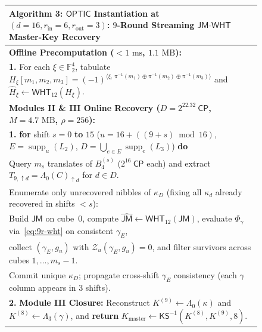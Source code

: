 \documentclass[11pt,a4paper]{article}
\theoremstyle{definition}
\theoremstyle{remark}
\newcommand{\Ftwo}{\mathbb{F}_2}
\newcommand{\OPTIC}{\mathsf{OPTIC}}
\newcommand{\supp}{\operatorname{supp}}
\newcommand{\CP}{\mathsf{CP}}
\begin{document}
\begin{figure}[t]
\centering
\small
\begin{tabular}{@{}p{}@{}}
\toprule
\textbf{Algorithm 3:} $\OPTIC$ Instantiation at $(d{=}16, r_{\text{in}}{=}6, r_{\text{out}}{=}3)$: $9$-Round Streaming $\mathsf{JM\text{-}WHT}$ Master-Key Recovery \\
\midrule
\textbf{Offline Precomputation ($< 1\text{ ms}$, $1.1\text{ MB}$):} \\
\hspace*{1.2em} \textbf{1.} For each $\xi \in \Ftwo^4$, tabulate $H_\xi[m_1, m_2, m_3] = (-1)^{\langle \xi,\, \pi^{-1}(m_1)\oplus\pi^{-1}(m_2)\oplus\pi^{-1}(m_3)\rangle}$ and $\widehat{H}_\xi \leftarrow \mathsf{WHT}_{12}(H_\xi)$. \\[3pt]
\midrule
\textbf{Modules II \& III Online Recovery ($D = 2^{22.32}~\CP$, $M = 4.7\text{ MB}$, $\rho = 256$):} \\
\hspace*{1.2em} \textbf{1.} \textbf{for} shift $s = 0$ \textbf{to} $15$ ($u = 16 + ((9 + s)\bmod 16)$, $E = \supp_u(L_2)$, $D = \bigcup_{e \in E}\supp_e(L_3)$) \textbf{do} \\
\hspace*{2.6em} Query $m_s$ translates of $B_4^{(s)}$ ($2^{16}~\CP$ each) and extract $T_{9,\uparrow d} = \Lambda_0(C)_{\uparrow d}$ for $d \in D$. \\
\hspace*{2.6em} Enumerate only unrecovered nibbles of $\kappa_D$ (fixing all $\kappa_d$ already recovered in shifts $< s$): \\
\hspace*{4.0em} Build $\mathsf{JM}$ on cube~$0$, compute $\widehat{\mathsf{JM}} \leftarrow \mathsf{WHT}_{12}(\mathsf{JM})$, evaluate $\Phi_\gamma$ via~\eqref{eq:9r-wht} on consistent $\gamma_E$, \\
\hspace*{4.0em} collect $(\gamma_E, g_u)$ with $\mathcal{Z}_u(\gamma_E, g_u) = 0$, and filter survivors across cubes $1, \dots, m_s{-}1$. \\
\hspace*{2.6em} Commit unique $\kappa_D$; propagate cross-shift $\gamma_E$ consistency (each $\gamma$ column appears in $3$ shifts). \\
\hspace*{1.2em} \textbf{2.} \textbf{Module III Closure:} Reconstruct $K^{(9)} \leftarrow \Lambda_0(\kappa)$ and $K^{(8)} \leftarrow \Lambda_3(\gamma)$, and \textbf{return} $K_{\text{master}} \leftarrow \mathsf{KS}^{-1}(K^{(8)}, K^{(9)}, 8)$. \\
\bottomrule
\end{tabular}
\end{figure}
\end{document}
